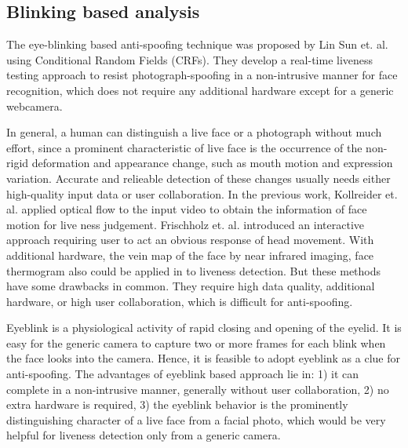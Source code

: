 \documentclass[journal]{IEEEtran}
\begin{document}
\subsection{Blinking based analysis}

The eye-blinking based anti-spoofing technique was proposed by Lin Sun et. al. \cite{pan2007eyeblink} using Conditional Random Fields (CRFs). They develop a real-time liveness testing approach to resist photograph-spoofing in a non-intrusive manner for face recognition, which does not require any additional hardware except for a generic webcamera.

In general, a human can distinguish a live face or a photograph without much effort, since a prominent characteristic of live face is the occurrence of the non-rigid deformation and appearance change, such as mouth motion and expression variation. Accurate and relieable detection of these changes usually needs either high-quality input data or user collaboration. In the previous work, Kollreider et. al. \cite{kollreider2005evaluating} applied optical flow to the input video to obtain the information of face motion for live ness judgement. Frischholz et. al. \cite{frischholz2003avoiding} introduced an interactive approach requiring user to act an obvious response of head movement. With additional hardware, the vein map of the face by near infrared imaging, face thermogram \cite{socolinsky2003face} also could be applied in to liveness detection. But these methods have some drawbacks in common. They require high data quality, additional hardware, or high user collaboration, which is difficult for anti-spoofing.

Eyeblink is a physiological activity of rapid closing and opening of the eyelid. It is easy for the generic camera to capture two or more frames for each blink when the face looks into the camera. Hence, it is feasible to adopt eyeblink as a clue for anti-spoofing. The advantages of eyeblink based approach lie in: 1) it can complete in a non-intrusive manner, generally without user collaboration, 2) no extra hardware is required, 3) the eyeblink behavior is the prominently distinguishing character of a live face from a facial photo, which would be very helpful for liveness detection only from a generic camera.
\end{document}
